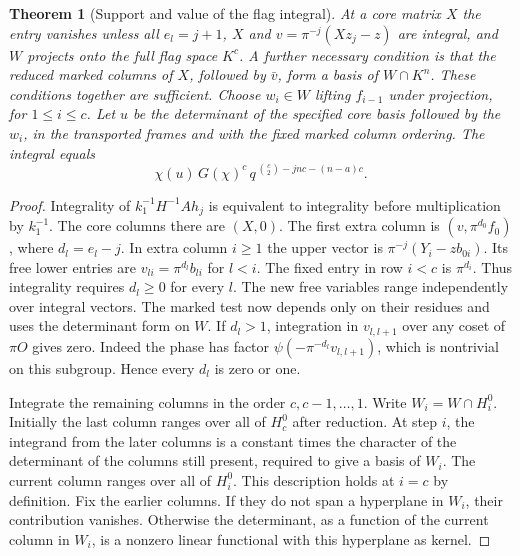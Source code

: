 \documentclass[a4paper,11pt]{article}
\newtheorem{theorem}[proposition]{Theorem}
\theoremstyle{definition}
\theoremstyle{remark}
\numberwithin{equation}{section}
\begin{document}
\begin{theorem}[Support and value of the flag integral]\leavevmode
\label{thm:ramifiedflag324}
At a core matrix \(X\) the entry vanishes unless all
\(e_l=j+1\), \(X\) and \(v=\pi^{-j}(Xz_j-z)\) are integral,
and \(W\) projects onto the full flag space \(K^c\).
A further necessary condition is that the reduced marked
columns of \(X\), followed by \(\bar v\), form a basis of
\(W\cap K^n\). These conditions together are sufficient.
Choose \(w_i\in W\) lifting \(f_{i-1}\) under projection,
for \(1\le i\le c\). Let \(u\) be the determinant of the
specified core basis followed by the \(w_i\), in the
transported frames and with the fixed marked column ordering.
The integral equals
\[
     \chi(u)\,G(\chi)^c\,
       q^{\,\binom c2-jnc-(n-a)c}.
\]
\end{theorem}
\begin{proof}
Integrality of \(k_1^{-1}H^{-1}Ah_j\) is equivalent to
integrality before multiplication by \(k_1^{-1}\). The core
columns there are \((X,0)\). The first extra column is
\((v,\pi^{d_0} f_0)\), where \(d_l=e_l-j\).
In extra column \(i\ge1\) the upper vector is
\(\pi^{-j}(Y_i-z b_{0i})\). Its free lower entries are
\(v_{li}=\pi^{d_l} b_{li}\) for \(l<i\). The fixed entry
in row \(i<c\) is \(\pi^{d_i}\). Thus integrality requires
\(d_l\ge0\) for every \(l\). The new free variables range
independently over integral vectors. The marked test now
depends only on their residues and uses the determinant
form on \(W\). If \(d_l>1\), integration in
\(v_{l,l+1}\) over any coset of \(\pi O\) gives zero.
Indeed the phase has factor \(\psi(-\pi^{-d_l}v_{l,l+1})\),
which is nontrivial on this subgroup. Hence every \(d_l\)
is zero or one.

Integrate the remaining columns in the order \(c,c-1,\ldots,1\).
Write \(W_i=W\cap H_i^0\). Initially the last column ranges
over all of \(H_c^0\) after reduction. At step \(i\), the
integrand from the later columns is a constant times the
character of the determinant of the columns still present,
required to give a basis of \(W_i\). The current column
ranges over all of \(H_i^0\). This description holds at
\(i=c\) by definition. Fix the earlier columns. If they
do not span a hyperplane in \(W_i\), their contribution
vanishes. Otherwise the determinant, as a function of the
current column in \(W_i\), is a nonzero linear functional
with this hyperplane as kernel.


\end{proof}
\end{document}

